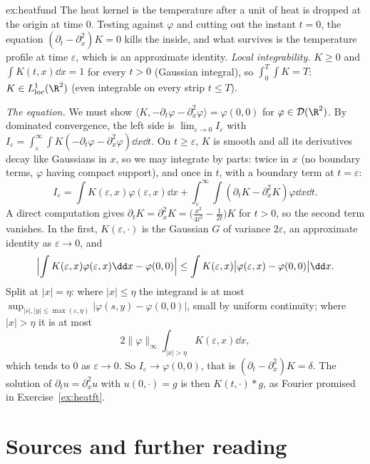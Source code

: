 \begin{solution}{ex:heatfund}
\idea The heat kernel is the temperature after a unit of heat is dropped at the origin at time $0$. Testing against $\varphi$ and cutting out the instant $t=0$, the equation $(\partial_t-\partial_x^2)K=0$ kills the inside, and what survives is the
temperature profile at time $\varepsilon$, which is an approximate identity.
\writeup \emph{Local integrability.} $K\ge0$ and $\int K(t,x)\dd x=1$ for every $t>0$ (Gaussian integral), so $\int_0^T\int K=T$: $K\in L^1_{\mathrm{loc}}(\R^2)$ (even integrable on every strip $t\le T$).

\emph{The equation.} We must show $\langle K,-\partial_t\varphi-\partial_x^2\varphi\rangle=\varphi(0,0)$ for $\varphi\in\mathcal D(\R^2)$. By dominated convergence, the left side is
$\lim_{\varepsilon\to0}I_\varepsilon$ with $I_\varepsilon=\int_\varepsilon^\infty\int K(-\partial_t\varphi-\partial_x^2\varphi)\dd x\dd t$. On $t\ge\varepsilon$, $K$ is smooth and all its derivatives decay like Gaussians in $x$, so we may
integrate by parts: twice in $x$ (no boundary terms, $\varphi$ having compact support), and once in $t$, with a boundary term at $t=\varepsilon$:
\[I_\varepsilon=\int K(\varepsilon,x)\varphi(\varepsilon,x)\dd x+\int_\varepsilon^\infty\!\!\int(\partial_tK-\partial_x^2K)\varphi\dd x\dd t.\]
A direct computation gives $\partial_tK=\partial_x^2K=\bigl(\frac{x^2}{4t^2}-\frac1{2t}\bigr)K$ for $t>0$, so the second term vanishes. In the first, $K(\varepsilon,\cdot)$ is the Gaussian $G$ of variance $2\varepsilon$, an approximate identity
as $\varepsilon\to0$, and
\[\Bigl|\int K(\varepsilon,x)\varphi(\varepsilon,x)\dd x-\varphi(0,0)\Bigr|\le\int K(\varepsilon,x)\bigl|\varphi(\varepsilon,x)-\varphi(0,0)\bigr|\dd x.\]
Split at $|x|=\eta$: where $|x|\le\eta$ the integrand is at most $\sup_{|s|,|y|\le\max(\varepsilon,\eta)}|\varphi(s,y)-\varphi(0,0)|$, small by uniform continuity; where $|x|>\eta$ it is at most
\[
2\|\varphi\|_\infty\int_{|x|>\eta}K(\varepsilon,x)\dd x,
\]
which tends to $0$ as $\varepsilon\to0$. So $I_\varepsilon\to\varphi(0,0)$, that is $(\partial_t-\partial_x^2)K=\delta$. The solution of $\partial_tu=\partial_x^2u$ with $u(0,\cdot)=g$ is then $K(t,\cdot)*g$, as Fourier promised in
Exercise~\ref{ex:heatft}.
\end{solution}

\section*{Sources and further reading}

